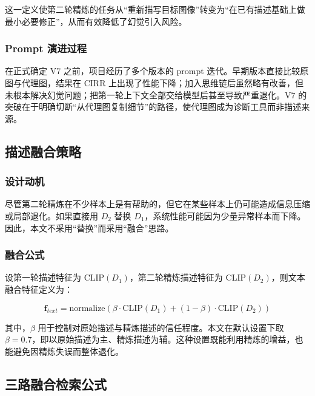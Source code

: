 \documentclass[12pt,a4paper,UTF8,oneside,openany]{ctexrep}
\begin{document}
这一定义使第二轮精炼的任务从``重新描写目标图像''转变为``在已有描述基础上做最小必要修正''，从而有效降低了幻觉引入风险。

\hypertarget{prompt-ux6f14ux8fdbux8fc7ux7a0b}{%
\subsubsection{Prompt 演进过程}\label{prompt-ux6f14ux8fdbux8fc7ux7a0b}}

在正式确定 V7 之前，项目经历了多个版本的 prompt
迭代。早期版本直接比较原图与代理图，结果在 CIRR
上出现了性能下降；加入思维链后虽然略有改善，但未根本解决幻觉问题；把第一轮上下文全部交给模型后甚至导致严重退化。V7
的突破在于明确切断``从代理图复制细节''的路径，使代理图成为诊断工具而非描述来源。

\hypertarget{ux63cfux8ff0ux878dux5408ux7b56ux7565}{%
\subsection{描述融合策略}\label{ux63cfux8ff0ux878dux5408ux7b56ux7565}}

\hypertarget{ux8bbeux8ba1ux52a8ux673a-1}{%
\subsubsection{设计动机}\label{ux8bbeux8ba1ux52a8ux673a-1}}

尽管第二轮精炼在不少样本上是有帮助的，但它在某些样本上仍可能造成信息压缩或局部退化。如果直接用
\(D_2\) 替换
\(D_1\)，系统性能可能因为少量异常样本而下降。因此，本文不采用``替换''而采用``融合''思路。

\hypertarget{ux878dux5408ux516cux5f0f}{%
\subsubsection{融合公式}\label{ux878dux5408ux516cux5f0f}}

设第一轮描述特征为 \(\text{CLIP}(D_1)\)，第二轮精炼描述特征为
\(\text{CLIP}(D_2)\)，则文本融合特征定义为：

\[
\mathbf{f}_{text}=\text{normalize}\left(\beta \cdot \text{CLIP}(D_1)+(1-\beta)\cdot \text{CLIP}(D_2)\right)
\]

其中，\(\beta\)
用于控制对原始描述与精炼描述的信任程度。本文在默认设置下取
\(\beta=0.7\)，即以原始描述为主、精炼描述为辅。这种设置既能利用精炼的增益，也能避免因精炼失误而整体退化。

\hypertarget{ux4e09ux8defux878dux5408ux68c0ux7d22ux516cux5f0f}{%
\subsection{三路融合检索公式}\label{ux4e09ux8defux878dux5408ux68c0ux7d22ux516cux5f0f}}
\end{document}
